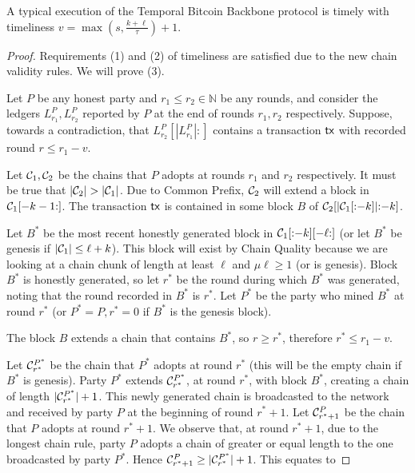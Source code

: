 \begin{theorem}
  A typical execution of the Temporal Bitcoin Backbone protocol is timely
  with timeliness $v = \max(s, \frac{k + \ell}{\tau}) + 1$.
\end{theorem}
\begin{proof}
  Requirements (1) and (2) of timeliness are satisfied due to the new chain validity rules.
  We will prove (3).

  Let $P$ be any honest party and $r_1 \leq r_2 \in \mathbb{N}$ be any rounds, and consider
  the ledgers $L^P_{r_1}, L^P_{r_2}$ reported by $P$ at the end of rounds $r_1, r_2$ respectively.
  Suppose, towards a contradiction, that $L^P_{r_2}[|L^P_{r_1}|{:}]$ contains a transaction
  $\textsf{tx}$ with recorded round $r \leq r_1 - v$.

  Let $\mathcal{C}_1, \mathcal{C}_2$ be the chains that $P$ adopts at rounds $r_1$
  and $r_2$ respectively.
  It must be true that $|\mathcal{C}_2| > |\mathcal{C}_1|$.
  Due to Common Prefix, $\mathcal{C}_2$ will extend a block in $\mathcal{C}_1[-k-1{:}]$.
  The transaction $\textsf{tx}$ is contained in some block $B$ of $\mathcal{C}_2[|\mathcal{C}_1[{:}{-k}]|{:}{-k}]$.

  Let $B^*$ be the most recent
  honestly generated block in $\mathcal{C}_1[{:}{-k}][{-\ell}{:}]$
  (or let $B^*$ be genesis if $|\mathcal{C}_1| \leq \ell + k$).
  This block will exist by
  Chain Quality because we are looking at a chain chunk of length at least $\ell$ and
  $\mu\ell \geq 1$ (or is genesis).
  Block $B^*$ is honestly generated, so let $r^*$ be the round
  during which $B^*$ was generated, noting that the round recorded in $B^*$ is $r^*$.
  Let $P^*$ be the party who mined $B^*$ at round $r^*$ (or $P^* = P, r^* = 0$ if $B^*$ is
  the genesis block).

  The block $B$ extends a chain that contains $B^*$, so $r \geq r^*$,
  therefore $r^* \leq r_1 - v$.

  Let $\mathcal{C}^{P^*}_{r^*}$ be the chain that $P^*$ adopts at
  round $r^*$ (this will be the empty chain if $B^*$ is genesis).
  Party $P^*$ extends $\mathcal{C}^{P^*}_{r^*}$, at round $r^*$, with block $B^*$,
  creating a chain of length $|\mathcal{C}^{P^*}_{r^*}| + 1$.
  This newly generated chain is broadcasted to the network and
  received by party $P$ at the beginning of round $r^* + 1$.
  Let $\mathcal{C}^P_{r^* + 1}$ be the chain that $P$ adopts at
  round $r^* + 1$. We observe that, at round $r^* + 1$, due to the
  longest chain rule, party $P$ adopts a chain of greater or equal
  length to the one broadcasted by party $P^*$. Hence
  $\mathcal{C}^P_{r^* + 1} \geq |\mathcal{C}^{P^*}_{r^*}| + 1$. This equates to


\end{proof}

